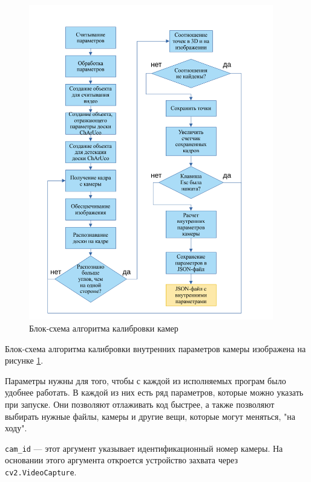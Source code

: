 \documentclass[12pt, a4paper]{article}
\begin{document}
\begin{figure}[h!]
  \begin{center}
    \includegraphics[width=0.95\textwidth]{images/block-schemes/intrinsics_scheme.png}
  \end{center}
  \caption{Блок-схема алгоритма калибровки камер}
  \label{fig:intrinsincs_block_scheme}
\end{figure}

Блок-схема алгоритма калибровки внутренних параметров камеры изображена на
рисунке \ref{fig:intrinsincs_block_scheme}.

Параметры нужны для того, чтобы с каждой из исполняемых програм было удобнее работать.
В каждой из них есть ряд параметров, которые можно указать при запуске. 
Они позволяют отлаживать код быстрее, а также позволяют выбирать нужные файлы,
камеры и другие вещи, которые могут меняться, "на ходу".
\par
\texttt{cam\_id} --- этот аргумент указывает идентификационный номер камеры.
На основании этого аргумента откроется устройство захвата через
\texttt{cv2.VideoCapture}. 
\end{document}
